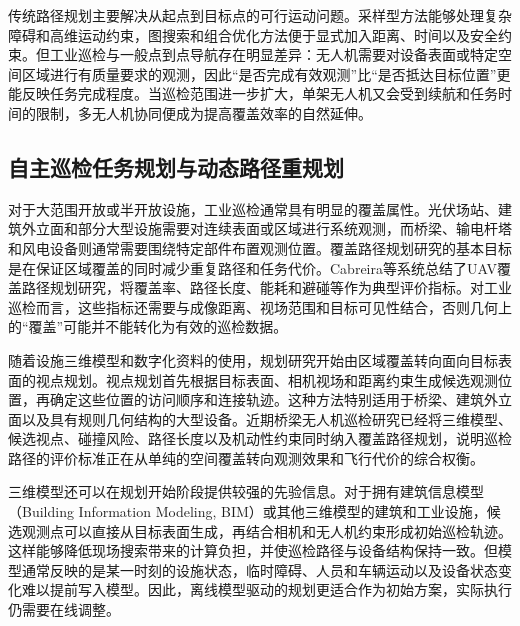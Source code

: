 传统路径规划主要解决从起点到目标点的可行运动问题。采样型方法能够处理复杂障碍和高维运动约束，图搜索和组合优化方法便于显式加入距离、时间以及安全约束\cite{LaValle2006,Karaman2011,Kingston2018,mao2023powerinspection,bolourian2020lidarbridge,zhao2024structuralinspection,wang2025uavsurface}。但工业巡检与一般点到点导航存在明显差异：无人机需要对设备表面或特定空间区域进行有质量要求的观测，因此“是否完成有效观测”比“是否抵达目标位置”更能反映任务完成程度\cite{Galceran2013,Cabreira2019,Zeng2020,wang2025uavsurface,jung2024bridgepose,gazani2023bagofviews,bolourian2020lidarbridge}。当巡检范围进一步扩大，单架无人机又会受到续航和任务时间的限制，多无人机协同便成为提高覆盖效率的自然延伸\cite{Gerkey2004,Chakraa2023,Skaltsis2023,ivic2023multiuavinspection,gilcastilla2024hetero,jeong2023makespan,obrien2023dynamictask}。

\subsection{自主巡检任务规划与动态路径重规划}

对于大范围开放或半开放设施，工业巡检通常具有明显的覆盖属性。光伏场站、建筑外立面和部分大型设施需要对连续表面或区域进行系统观测，而桥梁、输电杆塔和风电设备则通常需要围绕特定部件布置观测位置。覆盖路径规划研究的基本目标是在保证区域覆盖的同时减少重复路径和任务代价\cite{Choset2001,Galceran2013,zhao2024structuralinspection}。Cabreira等系统总结了UAV覆盖路径规划研究，将覆盖率、路径长度、能耗和避碰等作为典型评价指标\cite{Cabreira2019}。对工业巡检而言，这些指标还需要与成像距离、视场范围和目标可见性结合，否则几何上的“覆盖”可能并不能转化为有效的巡检数据。

随着设施三维模型和数字化资料的使用，规划研究开始由区域覆盖转向面向目标表面的视点规划。视点规划首先根据目标表面、相机视场和距离约束生成候选观测位置，再确定这些位置的访问顺序和连接轨迹\cite{Zeng2020,wang2025uavsurface,jung2024bridgepose,gazani2023bagofviews,bolourian2020lidarbridge}。这种方法特别适用于桥梁、建筑外立面以及具有规则几何结构的大型设备。近期桥梁无人机巡检研究已经将三维模型、候选视点、碰撞风险、路径长度以及机动性约束同时纳入覆盖路径规划，说明巡检路径的评价标准正在从单纯的空间覆盖转向观测效果和飞行代价的综合权衡\cite{Panigati2025}。

三维模型还可以在规划开始阶段提供较强的先验信息。对于拥有建筑信息模型（Building Information Modeling, BIM）或其他三维模型的建筑和工业设施，候选观测点可以直接从目标表面生成，再结合相机和无人机约束形成初始巡检轨迹。这样能够降低现场搜索带来的计算负担，并使巡检路径与设备结构保持一致。但模型通常反映的是某一时刻的设施状态，临时障碍、人员和车辆运动以及设备状态变化难以提前写入模型。因此，离线模型驱动的规划更适合作为初始方案，实际执行仍需要在线调整\cite{ortega2020aiaa}。

